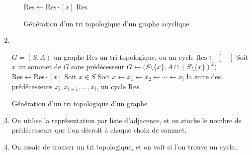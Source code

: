 \begin{enumerate}
\begin{itemize}
\begin{algorithm}[H]
\begin{algorithmic}[1]
							\State $\mathrm{Res} \gets \mathrm{Res} \cdot [x]$\/
						\EndWhile
						\State\Return $\mathrm{Res}$\/
					\end{algorithmic}
					\caption{Génération d'un tri topologique d'un graphe acyclique}
				\end{algorithm}
		\end{itemize}
	\item~
		\begin{algorithm}[H]
			\centering
			\begin{algorithmic}[1]
				\Entree $G = (S, A)$\/ un graphe
				\Sortie $\mathrm{Res}$\/ un tri topologique, ou un cycle
				\State $\mathrm{Res} \gets [\quad]$\/
						\State Soit $x$\/ un sommet de $G$\/ sans prédécesseur
						\State $G \gets \big(S \setminus \{x\}, A \cap (S \setminus \{x\})^2\big)$\/ 
						\State $\mathrm{Res} \gets \mathrm{Res} \cdot [x]$\/
					\Else
						\State Soit $x \in S$\/ 
						\State Soit $x \gets x_1 \gets x_2 \gets \cdots \gets x_i$\/ la suite des prédécesseurs
						\State\Return $x_i,x_{i+1},\ldots,x_i$, un cycle
					\EndIf
				\EndWhile
				\State\Return $\mathrm{Res}$\/
			\end{algorithmic}
			\caption{Génération d'un tri topologique d'un graphe}
		\end{algorithm}
	\item On utilise la représentation par liste d'adjacence, et on stocke le nombre de prédécesseurs que l'on décroit à chaque choix de sommet.
	\item On essaie de trouver un tri topologique, et on voit si l'on trouve un cycle.
\end{enumerate}
